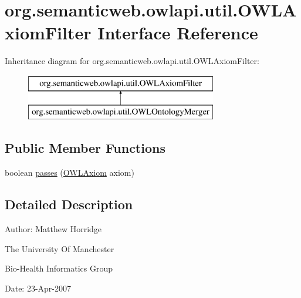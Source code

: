 \hypertarget{interfaceorg_1_1semanticweb_1_1owlapi_1_1util_1_1_o_w_l_axiom_filter}{\section{org.\-semanticweb.\-owlapi.\-util.\-O\-W\-L\-Axiom\-Filter Interface Reference}
\label{interfaceorg_1_1semanticweb_1_1owlapi_1_1util_1_1_o_w_l_axiom_filter}
}
Inheritance diagram for org.\-semanticweb.\-owlapi.\-util.\-O\-W\-L\-Axiom\-Filter\-:\begin{figure}[H]
\begin{center}
\leavevmode
\includegraphics[height=2.000000cm]{interfaceorg_1_1semanticweb_1_1owlapi_1_1util_1_1_o_w_l_axiom_filter}
\end{center}
\end{figure}
\subsection*{Public Member Functions}
\begin{DoxyCompactItemize}
\item 
boolean \hyperlink{interfaceorg_1_1semanticweb_1_1owlapi_1_1util_1_1_o_w_l_axiom_filter_a28fc5d9778f5f3f31cd84cebdf576276}{passes} (\hyperlink{interfaceorg_1_1semanticweb_1_1owlapi_1_1model_1_1_o_w_l_axiom}{O\-W\-L\-Axiom} axiom)
\end{DoxyCompactItemize}


\subsection{Detailed Description}
Author\-: Matthew Horridge\par
 The University Of Manchester\par
 Bio-\/\-Health Informatics Group\par
 Date\-: 23-\/\-Apr-\/2007\par
\par
 


